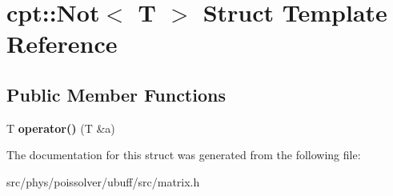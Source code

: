\hypertarget{structcpt_1_1Not}{}\section{cpt\+:\+:Not$<$ T $>$ Struct Template Reference}
\label{structcpt_1_1Not}
\subsection*{Public Member Functions}
\begin{DoxyCompactItemize}
\item 
T {\bfseries operator()} (T \&a)\hypertarget{structcpt_1_1Not_a9ec4824acd1220aca1f73e7704e5f7aa}{}\label{structcpt_1_1Not_a9ec4824acd1220aca1f73e7704e5f7aa}

\end{DoxyCompactItemize}


The documentation for this struct was generated from the following file\+:\begin{DoxyCompactItemize}
\item 
src/phys/poissolver/ubuff/src/matrix.\+h\end{DoxyCompactItemize}

